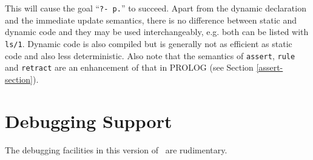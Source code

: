 
This will cause the goal ``{\tt ?- p.}'' to succeed.
Apart from the dynamic declaration and the immediate update semantics,
there is no difference between static and dynamic code and they
may be used interchangeably, e.g. both can be listed with {\tt ls/1}.
Dynamic code is also compiled but is generally not as efficient
as static code and also less deterministic.
Also note that the semantics of {\tt assert}, 
{\tt rule} and {\tt retract} are an enhancement
of that in PROLOG (see Section \ref{assert-section}).

\section{Debugging Support}

The debugging facilities in this version of \CLPR\ are rudimentary.

